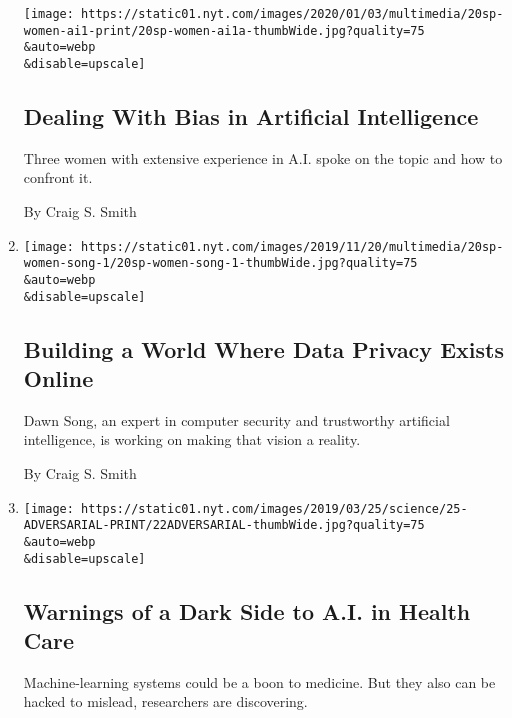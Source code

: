 \begin{enumerate}
  \texttt{[image: https://static01.nyt.com/images/2020/01/03/multimedia/20sp-women-ai1-print/20sp-women-ai1a-thumbWide.jpg?quality=75\\\&auto=webp\\\&disable=upscale]}

  \hypertarget{dealing-with-bias-in-artificial-intelligence}{%
  \subsection{Dealing With Bias in Artificial
  Intelligence}\label{dealing-with-bias-in-artificial-intelligence}}

  Three women with extensive experience in A.I. spoke on the topic and
  how to confront it.

  By Craig S. Smith
\item
  \href{/2019/11/19/technology/artificial-intelligence-dawn-song.html}{}

  \texttt{[image: https://static01.nyt.com/images/2019/11/20/multimedia/20sp-women-song-1/20sp-women-song-1-thumbWide.jpg?quality=75\\\&auto=webp\\\&disable=upscale]}

  \hypertarget{building-a-world-where-data-privacy-exists-online}{%
  \subsection{Building a World Where Data Privacy Exists
  Online}\label{building-a-world-where-data-privacy-exists-online}}

  Dawn Song, an expert in computer security and trustworthy artificial
  intelligence, is working on making that vision a reality.

  By Craig S. Smith
\item
  \href{/2019/03/21/science/health-medicine-artificial-intelligence.html}{}

  \texttt{[image: https://static01.nyt.com/images/2019/03/25/science/25-ADVERSARIAL-PRINT/22ADVERSARIAL-thumbWide.jpg?quality=75\\\&auto=webp\\\&disable=upscale]}

  \hypertarget{warnings-of-a-dark-side-to-ai-in-health-care}{%
  \subsection{Warnings of a Dark Side to A.I. in Health
  Care}\label{warnings-of-a-dark-side-to-ai-in-health-care}}

  Machine-learning systems could be a boon to medicine. But they also
  can be hacked to mislead, researchers are discovering.


\end{enumerate}

